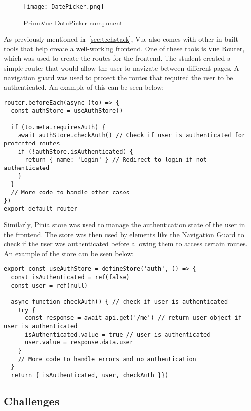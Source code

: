 \begin{figure}[htbp]
  \centering
  \texttt{[image: DatePicker.png]}
  \caption{PrimeVue DatePicker component}\label{fig:datepicker}
\end{figure}

\FloatBarrier{}

As previously mentioned in~\ref{sec:techstack}, Vue also comes with other in-built tools that help create a well-working frontend. One of these tools is Vue Router, which was used to create the routes for the frontend. The student created a simple router that would allow the user to navigate between different pages. A navigation guard was used to protect the routes that required the user to be authenticated. An example of this can be seen below:

\begin{lstlisting}[caption=Vue Router Navigation Guard]
router.beforeEach(async (to) => {
  const authStore = useAuthStore()

  if (to.meta.requiresAuth) {
    await authStore.checkAuth() // Check if user is authenticated for protected routes
    if (!authStore.isAuthenticated) {
      return { name: 'Login' } // Redirect to login if not authenticated
    }
  } 
  // More code to handle other cases
})
export default router
\end{lstlisting}

Similarly, Pinia store was used to manage the authentication state of the user in the frontend. The store was then used by elements like the Navigation Guard to check if the user was authenticated before allowing them to access certain routes. An example of the store can be seen below:

\begin{lstlisting}[caption=Pinia Store for Authentication]
export const useAuthStore = defineStore('auth', () => {
  const isAuthenticated = ref(false)
  const user = ref(null)

  async function checkAuth() { // check if user is authenticated
    try {
      const response = await api.get('/me') // return user object if user is authenticated
      isAuthenticated.value = true // user is authenticated
      user.value = response.data.user
    }
    // More code to handle errors and no authentication
  }
  return { isAuthenticated, user, checkAuth }})
\end{lstlisting}

\subsection{Challenges}

